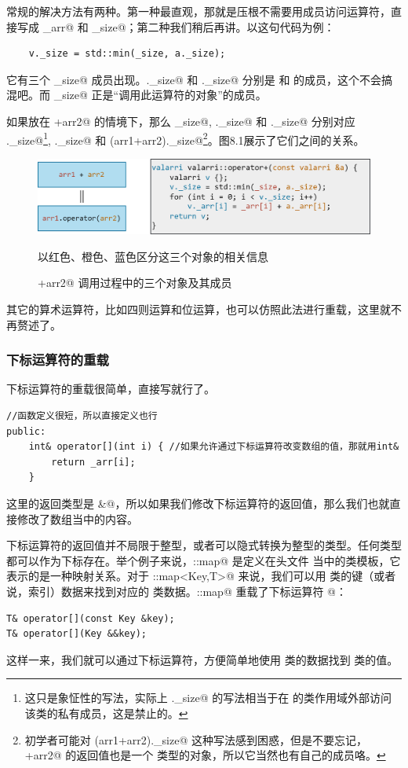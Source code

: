 常规的解决方法有两种。第一种最直观，那就是压根不需要用成员访问运算符，直接写成 \lstinline@_arr@ 和 \lstinline@_size@；第二种我们稍后再讲。以这句代码为例：
\begin{lstlisting}
    v._size = std::min(_size, a._size);
\end{lstlisting}
它有三个 \lstinline@_size@ 成员出现。\lstinline@v._size@ 和 \lstinline@a._size@ 分别是 \lstinline@v@ 和 \lstinline@a@ 的成员，这个不会搞混吧。而 \lstinline@_size@ 正是``调用此运算符的对象''的成员。\par
如果放在 +arr2@ 的情境下，那么 \lstinline@_size@, \lstinline@a._size@ 和 \lstinline@v._size@ 分别对应 ._size@\footnote{这只是象怔性的写法，实际上 ._size@ 的写法相当于在 \lstinline@valarri@ 的类作用域外部访问该类的私有成员，这是禁止的。}, ._size@ 和 \lstinline@(arr1+arr2)._size@\footnote{初学者可能对 \lstinline@(arr1+arr2)._size@ 这种写法感到困惑，但是不要忘记，+arr2@ 的返回值也是一个 \lstinline@valarri@ 类型的对象，所以它当然也有自己的成员咯。}。图8.1展示了它们之间的关系。\par
\begin{figure}[htbp]
    \centering
    \includegraphics[width=\textwidth]{../images/generalized_parts/08_operator_overloading_as_member_function_300.png}
    \caption{+arr2@ 调用过程中的三个对象及其成员}
    \footnotesize{以红色、橙色、蓝色区分这三个对象的相关信息}
\end{figure}
其它的算术运算符，比如四则运算和位运算，也可以仿照此法进行重载，这里就不再赘述了。\par
\subsubsection*{下标运算符的重载}
下标运算符的重载很简单，直接写就行了。
\begin{lstlisting}
//函数定义很短，所以直接定义也行
public:
    int& operator[](int i) { //如果允许通过下标运算符改变数组的值，那就用int&
        return _arr[i];
    }
\end{lstlisting}
这里的返回类型是 \lstinline@int&@，所以如果我们修改下标运算符的返回值，那么我们也就直接修改了数组当中的内容。\par
下标运算符的返回值并不局限于整型，或者可以隐式转换为整型的类型。任何类型都可以作为下标存在。举个例子来说，\lstinline@std::map@ 是定义在头文件 \lstinline@map@ 当中的类模板，它表示的是一种映射关系。对于 \lstinline@std::map<Key,T>@ 来说，我们可以用 \lstinline@Key@ 类的键（或者说，索引）数据来找到对应的 \lstinline@T@ 类数据。\lstinline@std::map@ 重载了下标运算符 \lstinline@[]@：
\begin{lstlisting}
T& operator[](const Key &key);
T& operator[](Key &&key);
\end{lstlisting}
这样一来，我们就可以通过下标运算符，方便简单地使用 \lstinline@Key@ 类的数据找到 \lstinline@T@ 类的值。\par
